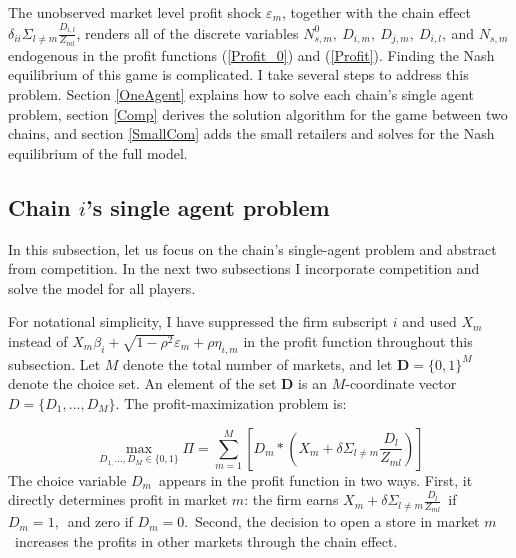 \documentclass[notitlepage,onecolumn,11pt]{article}
\begin{document}
The unobserved market level profit shock $\varepsilon _{m}$, together with
the chain effect $\delta _{ii}\Sigma _{l\neq m}\frac{D_{i,l}}{Z_{ml}}$,
renders all of the discrete variables $%
N_{s,m}^{0},~D_{i,m},~D_{j,m},~D_{i,l},~$and $N_{s,m}$ endogenous in the
profit functions (\ref{Profit_0}) and (\ref{Profit}). Finding the Nash
equilibrium of this game is complicated. I take several steps to address
this problem. Section \ref{OneAgent} explains how to solve each chain's
single agent problem, section \ref{Comp} derives the solution algorithm for
the game between two chains, and section \ref{SmallCom} adds the small
retailers and solves for the Nash equilibrium of the full model$.$

\subsection{Chain $i$'s single agent problem\label{OneAgent}}

In this subsection, let us focus on the chain's single-agent problem and
abstract from competition. In the next two subsections I incorporate
competition and solve the model for all players.

For notational simplicity, I have suppressed the firm subscript $i$ and used 
$X_{m}$ instead of $X_{m}\beta _{i}+\sqrt{1-\rho ^{2}}\varepsilon _{m}+\rho
\eta _{i,m}$ in the profit function throughout this subsection. Let $M$
denote the total number of markets, and let $\mathbf{D}=\{0,1\}^{M}$ denote
the choice set. An element of the set $\mathbf{D}$ is an $M$-coordinate
vector $D=\{D_{1},...,D_{M}\}$. The profit-maximization problem is:

\begin{equation*}
\max\limits_{D_{1,}...,D_{M}\in \{0,1\}}\Pi =\sum_{m=1}^{M}\left[ D_{m}\ast
(X_{m}+\delta \Sigma _{l\neq m}\frac{D_{l}}{Z_{ml}})\right]
\end{equation*}%
The choice variable $D_{m}$\ appears in the profit function in two ways.
First, it directly determines profit in market $m$: the firm earns $%
X_{m}+\delta \Sigma _{l\neq m}\frac{D_{l}}{Z_{ml}}$\ if $D_{m}=1,$\ and zero
if $D_{m}=0.$\ Second, the decision to open a store in market $m$\ increases
the profits in other markets through the chain effect.
\end{document}
